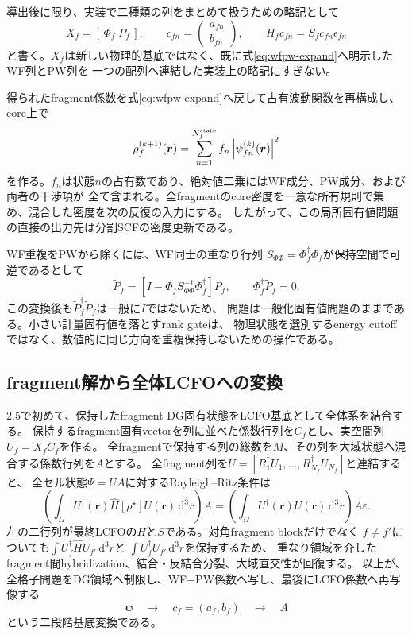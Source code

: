 \documentclass[11pt,a4paper]{article}
\newcommand{\dd}{\mathrm d}
\begin{document}
導出後に限り、実装で二種類の列をまとめて扱うための略記として
\begin{equation}
 X_f=[\,\Phi_f\;P_f\,],\qquad
 c_{fn}=\begin{pmatrix}a_{fn}\\b_{fn}\end{pmatrix},\qquad
 H_fc_{fn}=S_fc_{fn}\epsilon_{fn}
 \label{eq:local-transform}
\end{equation}
と書く。$X_f$は新しい物理的基底ではなく、既に式\eqref{eq:wfpw-expand}へ明示したWF列とPW列を
一つの配列へ連結した実装上の略記にすぎない。

得られたfragment係数を式\eqref{eq:wfpw-expand}へ戻して占有波動関数を再構成し、core上で
\begin{equation}
 \rho_f^{(k+1)}(\boldsymbol r)
 =\sum_{n=1}^{N_f^{\rm state}}f_n
  \left|\psi_{fn}^{(k)}(\boldsymbol r)\right|^2
\end{equation}
を作る。$f_n$は状態$n$の占有数であり、絶対値二乗にはWF成分、PW成分、および両者の干渉項が
全て含まれる。全fragmentのcore密度を一意な所有規則で集め、混合した密度を次の反復の入力にする。
したがって、この局所固有値問題の直接の出力先は分割SCFの密度更新である。

WF重複をPWから除くには、WF同士の重なり行列
$S_{\Phi\Phi}=\Phi_f^\dagger\Phi_f$が保持空間で可逆であるとして
\begin{equation}
 \widetilde P_f=\left[I-\Phi_fS_{\Phi\Phi}^{-1}\Phi_f^\dagger\right]P_f,
 \qquad \Phi_f^\dagger\widetilde P_f=0.
 \label{eq:block-project}
\end{equation}
この変換後も$\widetilde P_f^\dagger\widetilde P_f$は一般に$I$ではないため、
問題は一般化固有値問題のままである。小さい計量固有値を落とすrank gateは、
物理状態を選別するenergy cutoffではなく、数値的に同じ方向を重複保持しないための操作である。

\subsection{fragment解から全体LCFOへの変換}
2.5で初めて、保持したfragment DG固有状態をLCFO基底として全体系を結合する。
保持するfragment固有vectorを列に並べた係数行列を$C_f$とし、実空間列$U_f=X_fC_f$を作る。
全fragmentで保持する列の総数を$M$、その列を大域状態へ混合する係数行列を$A$とする。
全fragment列を$U=[R_1^\dagger U_1,\ldots,R_{N_f}^\dagger U_{N_f}]$と連結すると、
全セル状態$\Psi=UA$に対するRayleigh--Ritz条件は
\begin{equation}
 \left(\int_\Omega U^\dagger(\boldsymbol r)
 \hat H[\rho^\star]U(\boldsymbol r)\,\dd^3r\right)A
 =\left(\int_\Omega U^\dagger(\boldsymbol r)U(\boldsymbol r)\,\dd^3r\right)A\varepsilon.
 \label{eq:dg-to-lcfo}
\end{equation}
左の二行列が最終LCFOの$H$と$S$である。対角fragment blockだけでなく
$f\ne f'$についても$\int U_f^\dagger\hat HU_{f'}\,\dd^3r$と
$\int U_f^\dagger U_{f'}\,\dd^3r$を保持するため、
重なり領域を介したfragment間hybridization、結合・反結合分裂、大域直交性が回復する。
以上が、全格子問題をDG領域へ制限し、WF+PW係数へ写し、最後にLCFO係数へ再写像する
\begin{equation}
 \boldsymbol\psi\quad\longrightarrow\quad c_f=(a_f,b_f)
 \quad\longrightarrow\quad A
\end{equation}
という二段階基底変換である。
\end{document}
